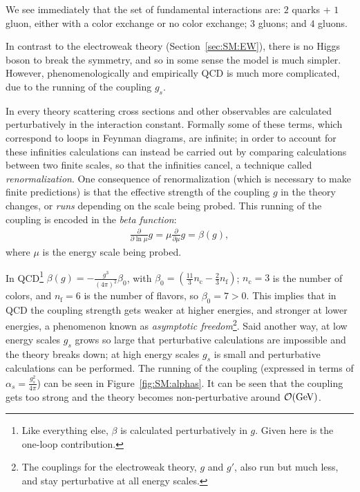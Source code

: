 We see immediately that the set of fundamental interactions are: $2$ quarks + $1$ gluon, either with a color exchange or no color exchange; $3$ gluons; and $4$ gluons.

In contrast to the electroweak theory (Section~\ref{sec:SM:EW}), there is no Higgs boson to break the symmetry, and so in some sense the model is much simpler.
However, phenomenologically and empirically QCD is much more complicated, due to the running of the coupling $g_s$.

In every theory scattering cross sections and other observables are calculated perturbatively in the interaction constant.
Formally some of these terms, which correspond to loops in Feynman diagrams, are infinite; in order to account for these infinities calculations can instead be carried out by comparing calculations between two finite scales, so that the infinities cancel, a technique called \textit{renormalization}.
One consequence of renormalization (which is necessary to make finite predictions) is that the effective strength of the coupling $g$ in the theory changes, or \textit{runs} depending on the scale being probed.
This running of the coupling is encoded in the \textit{beta function}:
\begin{align}
  \frac{\partial}{\partial \ln \mu}g = \mu\frac{\partial}{\partial\mu}g = \beta(g),
\end{align}
where $\mu$ is the energy scale being probed.

In QCD\footnote{Like everything else, $\beta$ is calculated perturbatively in $g$. Given here is the one-loop contribution.} $\beta(g) = -\frac{g^3}{(4\pi)^2}\beta_0$, with $\beta_0=(\frac{11}{3}n_\text{c} - \frac{2}{3} n_\text{f})$; $n_\text{c}=3$ is the number of colors, and $n_\text{f}=6$ is the number of flavors, so $\beta_0=7>0$.
This implies that in QCD the coupling strength gets weaker at higher energies, and stronger at lower energies, a phenomenon known as \textit{asymptotic freedom}\footnote{The couplings for the electroweak theory, $g$ and $g'$, also run but much less, and stay perturbative at all energy scales.}.
Said another way, at low energy scales $g_s$ grows so large that perturbative calculations are impossible and the theory breaks down; at high energy scales $g_s$ is small and perturbative calculations can be performed.
The running of the coupling (expressed in terms of $\alpha_s = \frac{g_s^2}{4\pi}$) can be seen in Figure~\ref{fig:SM:alphas}.
It can be seen that the coupling gets too strong and the theory becomes non-perturbative around $\mathcal{O}(\mathrm{GeV})$.

